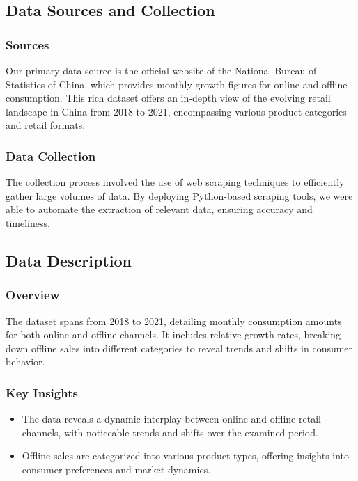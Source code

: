 \documentclass{article}
\begin{document}
\subsection*{Data Sources and Collection}

\subsubsection*{Sources}
Our primary data source is the official website of the National Bureau of Statistics of China, which provides monthly growth figures for online and offline consumption. This rich dataset offers an in-depth view of the evolving retail landscape in China from 2018 to 2021, encompassing various product categories and retail formats.

\subsubsection*{Data Collection}
The collection process involved the use of web scraping techniques to efficiently gather large volumes of data. By deploying Python-based scraping tools, we were able to automate the extraction of relevant data, ensuring accuracy and timeliness.

\subsection*{Data Description}

\subsubsection*{Overview}
The dataset spans from 2018 to 2021, detailing monthly consumption amounts for both online and offline channels. It includes relative growth rates, breaking down offline sales into different categories to reveal trends and shifts in consumer behavior.

\subsubsection*{Key Insights}
\begin{itemize}
    \item The data reveals a dynamic interplay between online and offline retail channels, with noticeable trends and shifts over the examined period.
    \item Offline sales are categorized into various product types, offering insights into consumer preferences and market dynamics.
\end{itemize}
\end{document}

